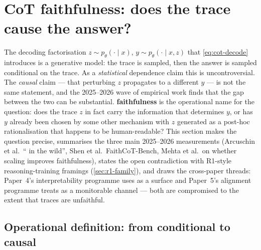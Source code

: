 
\section{CoT faithfulness: does the trace cause the answer?}
\label{sec:cot-faithfulness}

The decoding factorisation $z \sim p_\theta(\cdot \mid x)$,
$y \sim p_\theta(\cdot \mid x, z)$ that
\cref{eq:cot-decode} introduces is a generative model: the trace is
sampled, then the answer is sampled conditional on the trace. As a
\emph{statistical} dependence claim this is uncontroversial. The
\emph{causal} claim — that perturbing $z$ propagates to a different $y$
— is not the same statement, and the 2025--2026 wave of empirical work
finds that the gap between the two can be substantial. \textbf{
faithfulness} is the operational name for the question: does the trace
$z$ in fact carry the information that determines $y$, or has $y$
already been chosen by some other mechanism with $z$ generated as a
post-hoc rationalisation that happens to be human-readable? This
section makes the question precise, summarises the three main
2025--2026 measurements (Arcuschin et al.\ `` in the wild'', Shen et
al.\ FaithCoT-Bench, Mehta et al.\ on whether scaling improves
faithfulness), states the open contradiction with R1-style
reasoning-training framings (\cref{sec:r1-family}), and draws the
cross-paper threads: Paper~4's interpretability programme uses  as a
 surface and Paper~5's alignment programme treats  as a
monitorable channel — both are compromised to the extent that traces
are unfaithful.

\subsection{Operational definition: from conditional to causal}
\label{sec:faith-def}

